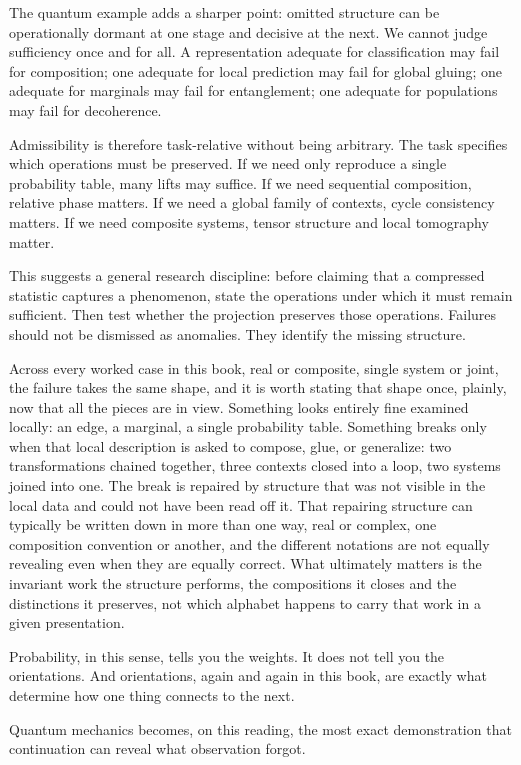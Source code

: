 \documentclass[12pt,openany]{book}
\begin{document}
The quantum example adds a sharper point: omitted structure can be operationally dormant at one stage and decisive at the next. We cannot judge sufficiency once and for all. A representation adequate for classification may fail for composition; one adequate for local prediction may fail for global gluing; one adequate for marginals may fail for entanglement; one adequate for populations may fail for decoherence.

Admissibility is therefore task-relative without being arbitrary. The task specifies which operations must be preserved. If we need only reproduce a single probability table, many lifts may suffice. If we need sequential composition, relative phase matters. If we need a global family of contexts, cycle consistency matters. If we need composite systems, tensor structure and local tomography matter.

This suggests a general research discipline: before claiming that a compressed statistic captures a phenomenon, state the operations under which it must remain sufficient. Then test whether the projection preserves those operations. Failures should not be dismissed as anomalies. They identify the missing structure.

Across every worked case in this book, real or composite, single system or joint, the failure takes the same shape, and it is worth stating that shape once, plainly, now that all the pieces are in view. Something looks entirely fine examined locally: an edge, a marginal, a single probability table. Something breaks only when that local description is asked to compose, glue, or generalize: two transformations chained together, three contexts closed into a loop, two systems joined into one. The break is repaired by structure that was not visible in the local data and could not have been read off it. That repairing structure can typically be written down in more than one way, real or complex, one composition convention or another, and the different notations are not equally revealing even when they are equally correct. What ultimately matters is the invariant work the structure performs, the compositions it closes and the distinctions it preserves, not which alphabet happens to carry that work in a given presentation.

Probability, in this sense, tells you the weights. It does not tell you the orientations. And orientations, again and again in this book, are exactly what determine how one thing connects to the next.

Quantum mechanics becomes, on this reading, the most exact demonstration that continuation can reveal what observation forgot.
\end{document}
